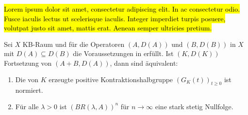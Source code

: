 \hl{Lorem ipsum dolor sit amet, consectetur adipiscing elit. In ac consectetur odio. Fusce iaculis lectus ut scelerisque iaculis. Integer imperdiet turpis posuere, volutpat justo sit amet, mattis erat. Aenean semper ultricies pretium.}

\begin{fsatz}\cite{kato_1954}\label{Charakterisierung der Normiertheit von G_K(t)}
Sei $X$ KB-Raum und für die Operatoren $(A, D(A))$ und $(B, D(B))$ in $X$ mit $D(A)\subseteq D(B)$ die Voraussetzungen in  erfüllt. Ist $(K, D(K))$ Fortsetzung von $(A+B, D(A))$, dann sind äquivalent:
\begin{enumerate}
\item Die von $K$ erzeugte positive Kontraktionshalbgruppe $(G_K(t))_{t\geq0}$ ist normiert.
\item Für alle $\lambda >0$ ist $(BR(\lambda, A))^n$ für $n\to\infty$ eine stark stetig Nullfolge. 
\end{enumerate}
\end{fsatz}


